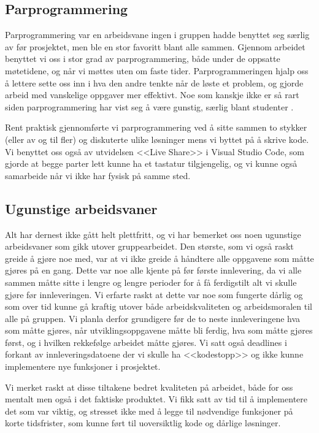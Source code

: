 \documentclass[a4paper, 12pt]{article}  %
\begin{document}
\subsection{Parprogrammering}

Parprogrammering var en arbeidsvane ingen i gruppen hadde benyttet seg særlig av før prosjektet, men ble en stor favoritt blant alle sammen.
Gjennom arbeidet benyttet vi oss i stor grad av parprogrammering, både under de oppsatte møtetidene, og når vi møttes uten om faste tider.
Parprogrammeringen hjalp oss å lettere sette oss inn i hva den andre tenkte når de løste et problem, og gjorde arbeid med vanskelige oppgaver mer effektivt. 
Noe som kanskje ikke er så rart siden parprogrammering har vist seg å være gunstig, særlig blant studenter \cite{parprog}.

Rent praktisk gjennomførte vi parprogrammering ved å sitte sammen to stykker (eller av og til fler) og diskuterte ulike løsninger mens vi byttet på å skrive kode.
Vi benyttet oss også av utvidelsen <<Live Share>> i Visual Studio Code, som gjorde at begge parter lett kunne ha et tastatur tilgjengelig, og vi kunne også samarbeide når vi ikke har fysisk på samme sted.

\subsection{Ugunstige arbeidsvaner}

Alt har dernest ikke gått helt plettfritt, og vi har bemerket oss noen ugunstige arbeidsvaner som gikk utover gruppearbeidet.
Den største, som vi også raskt greide å gjøre noe med, var at vi ikke greide å håndtere alle oppgavene som måtte gjøres på en gang.
Dette var noe alle kjente på før første innlevering, da vi alle sammen måtte sitte i lengre og lengre perioder for å få ferdigstilt alt vi skulle gjøre før innleveringen.
Vi erfarte raskt at dette var noe som fungerte dårlig og som over tid kunne gå kraftig utover både arbeidskvaliteten og arbeidsmoralen til alle på gruppen.
Vi planla derfor grundigere før de to neste innleveringene hva som måtte gjøres, når utviklingsoppgavene måtte bli ferdig, hva som måtte gjøres først, og i hvilken rekkefølge arbeidet måtte gjøres.
Vi satt også deadlines i forkant av innleveringsdatoene der vi skulle ha <<kodestopp>> og ikke kunne implementere nye funksjoner i prosjektet.

Vi merket raskt at disse tiltakene bedret kvaliteten på arbeidet, både for oss mentalt men også i det faktiske produktet.
Vi fikk satt av tid til å implementere det som var viktig, og stresset ikke med å legge til nødvendige funksjoner på korte tidsfrister, som kunne ført til uoversiktlig kode og dårlige løsninger.
\end{document}
